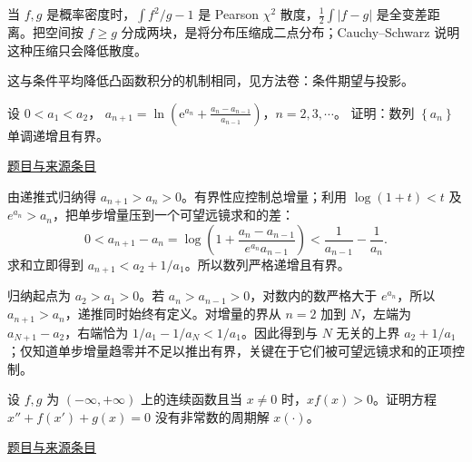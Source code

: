 \documentclass[UTF8,12pt,a4paper,fontset=fandol]{ctexart}
\begin{document}
\begin{remark}[方法与条件]当 $f,g$ 是概率密度时，$\int f^2/g-1$ 是 Pearson $\chi^2$ 散度，$\frac12\int|f-g|$ 是全变差距离。把空间按 $f\ge g$ 分成两块，是将分布压缩成二点分布；Cauchy--Schwarz 说明这种压缩只会降低散度。

这与条件平均降低凸函数积分的机制相同，见方法卷：条件期望与投影。\end{remark}

\begin{example}\label{ex:fin15-low:9}\label{pr:fin15-low:9}

设 $0 < a_{1} < a_{2}$，
$a_{n+1} = \ln\left(\mathrm{e}^{a_{n}} + \frac{a_{n} - a_{n-1}}{a_{n-1}}\right)$，$n = 2,3,\cdots$。
证明：数列 $\left\{a_{n}\right\}$ 单调递增且有界。

\par\href{https://github.com/lzxcr/cmc-mathematics/blob/64916fa1fdbc3e444a652eca204d5669058ee321/src/problems/finals/15/10.md}{题目与来源条目}

\end{example}

\begin{solve}\label{ans:fin15-low:9}

由递推式归纳得 $a_{n+1}>a_n>0$。有界性应控制总增量；利用 $\log(1+t)<t$ 及 $e^{a_n}>a_n$，把单步增量压到一个可望远镜求和的差：
\[
0<a_{n+1}-a_n
=\log\left(1+\frac{a_n-a_{n-1}}{e^{a_n}a_{n-1}}\right)
<\frac1{a_{n-1}}-\frac1{a_n}.
\]
求和立即得到 $a_{n+1}<a_2+1/a_1$。所以数列严格递增且有界。

归纳起点为 $a_2>a_1>0$。若 $a_n>a_{n-1}>0$，对数内的数严格大于 $e^{a_n}$，所以 $a_{n+1}>a_n$，递推同时始终有定义。对增量的界从 $n=2$ 加到 $N$，左端为 $a_{N+1}-a_2$，右端恰为 $1/a_1-1/a_N<1/a_1$。因此得到与 $N$ 无关的上界 $a_2+1/a_1$；仅知道单步增量趋零并不足以推出有界，关键在于它们被可望远镜求和的正项控制。

\end{solve}

\begin{example}\label{ex:fin15-low:10}\label{pr:fin15-low:10}

设 $f,g$ 为 $(-\infty,+\infty)$ 上的连续函数且当 $x \neq 0$ 时，$xf(x) > 0$。证明方程 $x'' + f\left(x'\right) + g(x) = 0$ 没有非常数的周期解 $x(\cdot)$。

\par\href{https://github.com/lzxcr/cmc-mathematics/blob/64916fa1fdbc3e444a652eca204d5669058ee321/src/problems/finals/15/12.md}{题目与来源条目}

\end{example}
\end{document}
